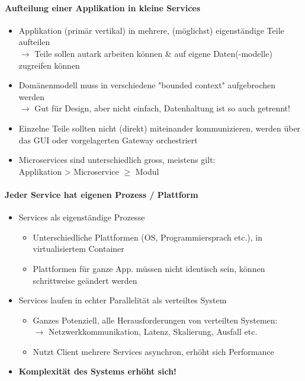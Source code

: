 \documentclass[a4paper]{article}
\begin{document}
				\paragraph{Aufteilung einer Applikation in kleine Services}
				
					\begin{itemize}
						\item Applikation (primär vertikal) in mehrere, (möglichst) eigenständige Teile aufteilen\\
								$\rightarrow$ Teile sollen autark arbeiten können \& auf eigene Daten(-modelle) zugreifen können
						\item Domänenmodell muss in verschiedene "bounded context" aufgebrochen werden\\
								$\rightarrow$ Gut für Design, aber nicht einfach, Datenhaltung ist so auch getrennt!
						\item Einzelne Teile sollten nicht (direkt) miteinander kommunizieren, werden über das GUI oder vorgelagerten Gateway orchestriert
						\item Microservices sind unterschiedlich gross, meistens gilt:\\
								Applikation > Microservice  $\geq$ Modul
					\end{itemize}
				
				\newpage
				
				\paragraph{Jeder Service hat eigenen Prozess / Plattform}
				
					\begin{itemize}
						\item Services als eigenständige Prozesse
							\begin{itemize}
								\item Unterschiedliche Plattformen (OS, Programmiersprach etc.), in virtualisiertem Container
								\item Plattformen für ganze App. müssen nicht identisch sein, können schrittweise geändert werden
							\end{itemize}
						\item Services laufen in echter Parallelität als verteiltes System
							\begin{itemize}
								\item Ganzes Potenziell, alle Herausforderungen von verteilten Systemen:\\
										$\rightarrow$ Netzwerkkommunikation, Latenz, Skalierung, Ausfall etc.
								\item Nutzt Client mehrere Services asynchron, erhöht sich Performance
							\end{itemize}
						\item \textbf{Komplexität des Systems erhöht sich!}
					\end{itemize}
\end{document}
